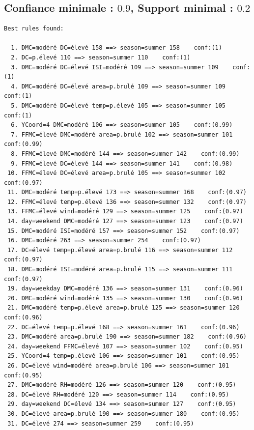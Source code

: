 \documentclass{article}
\begin{document}
\begin{sffamily}
\subsection{Confiance minimale : $0.9$, Support minimal : $0.2$} \label{annexA}

\begin{center}
	\begin{verbatim}
Best rules found:

  1. DMC=modéré DC=élevé 158 ==> season=summer 158    conf:(1)
  2. DC=p.élevé 110 ==> season=summer 110    conf:(1)
  3. DMC=modéré DC=élevé ISI=modéré 109 ==> season=summer 109    conf:(1)
  4. DMC=modéré DC=élevé area=p.brulé 109 ==> season=summer 109    conf:(1)
  5. DMC=modéré DC=élevé temp=p.élevé 105 ==> season=summer 105    conf:(1)
  6. YCoord=4 DMC=modéré 106 ==> season=summer 105    conf:(0.99)
  7. FFMC=élevé DMC=modéré area=p.brulé 102 ==> season=summer 101    conf:(0.99)
  8. FFMC=élevé DMC=modéré 144 ==> season=summer 142    conf:(0.99)
  9. FFMC=élevé DC=élevé 144 ==> season=summer 141    conf:(0.98)
 10. FFMC=élevé DC=élevé area=p.brulé 105 ==> season=summer 102    conf:(0.97)
 11. DMC=modéré temp=p.élevé 173 ==> season=summer 168    conf:(0.97)
 12. FFMC=élevé temp=p.élevé 136 ==> season=summer 132    conf:(0.97)
 13. FFMC=élevé wind=modéré 129 ==> season=summer 125    conf:(0.97)
 14. day=weekend DMC=modéré 127 ==> season=summer 123    conf:(0.97)
 15. DMC=modéré ISI=modéré 157 ==> season=summer 152    conf:(0.97)
 16. DMC=modéré 263 ==> season=summer 254    conf:(0.97)
 17. DC=élevé temp=p.élevé area=p.brulé 116 ==> season=summer 112    conf:(0.97)
 18. DMC=modéré ISI=modéré area=p.brulé 115 ==> season=summer 111    conf:(0.97)
 19. day=weekday DMC=modéré 136 ==> season=summer 131    conf:(0.96)
 20. DMC=modéré wind=modéré 135 ==> season=summer 130    conf:(0.96)
 21. DMC=modéré temp=p.élevé area=p.brulé 125 ==> season=summer 120    conf:(0.96)
 22. DC=élevé temp=p.élevé 168 ==> season=summer 161    conf:(0.96)
 23. DMC=modéré area=p.brulé 190 ==> season=summer 182    conf:(0.96)
 24. day=weekend FFMC=élevé 107 ==> season=summer 102    conf:(0.95)
 25. YCoord=4 temp=p.élevé 106 ==> season=summer 101    conf:(0.95)
 26. DC=élevé wind=modéré area=p.brulé 106 ==> season=summer 101    conf:(0.95)
 27. DMC=modéré RH=modéré 126 ==> season=summer 120    conf:(0.95)
 28. DC=élevé RH=modéré 120 ==> season=summer 114    conf:(0.95)
 29. day=weekend DC=élevé 134 ==> season=summer 127    conf:(0.95)
 30. DC=élevé area=p.brulé 190 ==> season=summer 180    conf:(0.95)
 31. DC=élevé 274 ==> season=summer 259    conf:(0.95)

\end{verbatim}
\end{center}
\end{sffamily}
\end{document}
